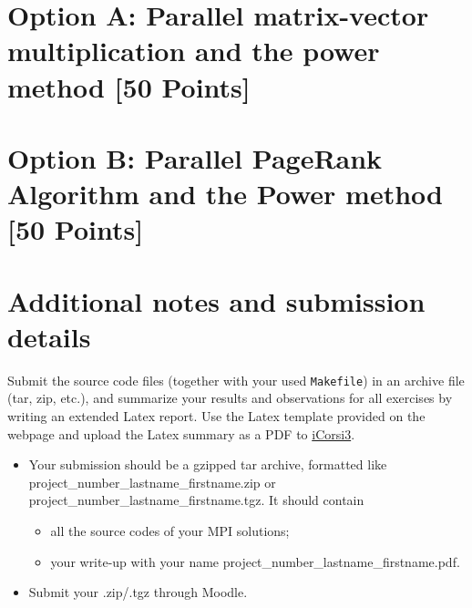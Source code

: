 \documentclass[unicode,11pt,a4paper,oneside,numbers=endperiod,openany]{scrartcl}
\begin{document}
\section{Option A: Parallel matrix-vector multiplication and the power method [50 Points]}





\section{Option B: Parallel PageRank Algorithm and the Power method  [50 Points]}


\section*{Additional notes and submission details}
Submit the source code files (together with your used \texttt{Makefile}) in
an archive file (tar, zip, etc.), and summarize your results and
observations for all exercises by writing an extended Latex report.
Use the Latex template provided on the webpage and upload the Latex summary
as a PDF to \href{https://www.icorsi.ch/course/view.php?id=10049}{iCorsi3}.

\begin{itemize}
	\item Your submission should be a gzipped tar archive, formatted like project\_number\_lastname\_firstname.zip or project\_number\_lastname\_firstname.tgz. 
	It should contain
	\begin{itemize}
		\item all the source codes of your MPI solutions;
		\item your write-up with your name  project\_number\_lastname\_firstname.pdf.
	\end{itemize}
	\item Submit your .zip/.tgz through Moodle.
\end{itemize}
\end{document}
